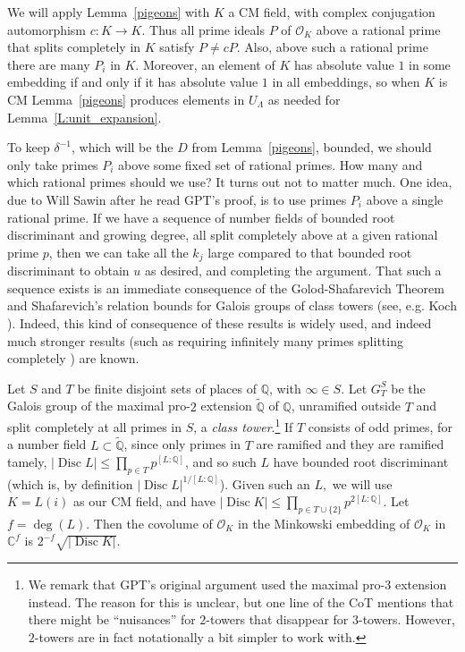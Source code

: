 \documentclass[11pt,reqno]{amsart}
\numberwithin{equation}{section}
\theoremstyle{definition}
\theoremstyle{remark}
\newcommand{\on}{\operatorname}
\newcommand{\C}{\mathbb{C}}
\newcommand{\Z}{\mathbb{Z}}
\newcommand{\Q}{\mathbb{Q}}
\newcommand{\Disc}{\on{Disc}}
\renewcommand{\O}{\mathcal{O}}
\begin{document}
We will apply Lemma~\ref{pigeons} with $K$ a CM field, with complex conjugation automorphism $c:K\to K$.
Thus all prime ideals $P$ of $\O_K$ above a rational prime that splits completely in $K$ satisfy $P\ne cP$.  Also, above such a rational prime there are many $P_i$ in $K$.
Moreover, an element of $K$ has absolute value $1$
in some embedding if and only if it
has absolute value $1$ in all embeddings, so when $K$ is CM
Lemma~\ref{pigeons} produces elements in $U_\Lambda$ as needed for 
Lemma~\ref{L:unit_expansion}.


To keep $\delta^{-1}$, which will be the $D$ from Lemma~\ref{pigeons},
bounded, we should only take primes $P_i$ above some fixed set of rational primes.  How many and which rational primes should we use?  It turns out not to matter much.
 One idea, due to Will Sawin after he read GPT's proof, is to use primes $P_i$ above a single rational prime.  If we have a sequence of number fields of bounded root discriminant and growing degree, all split completely above at a given rational prime $p$, then we can take all the $k_j$ large compared to that bounded root discriminant to obtain $u$ as desired, and completing the argument.  That such a sequence exists is an immediate consequence of the Golod-Shafarevich Theorem  \cite{GolodShafarevich1964ClassFieldTower,GolodShafarevich1965ClassFieldTowersTranslation} and Shafarevich's relation bounds for Galois groups of class towers \cite{Shafarevich1963RamificationOriginal,Shafarevich1966RamificationTranslation} (see, e.g. Koch \cite[Theorem 11.5]{Koch2002GaloisTheoryPExtensions}).  Indeed, this kind of consequence of these results is widely used, and indeed much stronger results (such as requiring infinitely many primes splitting completely \cite{hajir2021cutting}) are known.

Let $S$ and $T$ be finite disjoint sets of places of $\Q$, with $\infty\in S$.  Let $G_T^S$ be the Galois group of the maximal pro-$2$ extension $\tilde{\Q}$ of $\Q$, unramified outside $T$ and split completely at all primes in $S$, a \emph{class tower}.\footnote{We remark that GPT's original argument used the maximal pro-$3$ extension instead.
The reason for this is unclear, but one line of the CoT mentions that there might be ``nuisances'' for $2$-towers that disappear for $3$-towers.
However, $2$-towers are in fact notationally a bit simpler to work with.}
If $T$ consists of odd primes, for a number field $L\subset \tilde{\Q}$, since only primes in $T$ are ramified and they are ramified tamely, $|\Disc L| \leq \prod_{p\in T}p^{[L:\Q]}$, and so such $L$ have bounded root discriminant (which is, by definition $|\Disc L|^{1/[L:\Q]}$).
Given such an $L,$ we will use $K=L(i)$ as our CM field, and have $|\Disc K|\leq \prod_{p\in T\cup\{2\}}p^{2[L:\Q]}$.  Let $f=\deg(L)$. Then the covolume of $\O_K$ in the Minkowski embedding of $\O_K$ in $\C^f$ is $2^{-f}\sqrt{|\Disc K|}$.
\end{document}
